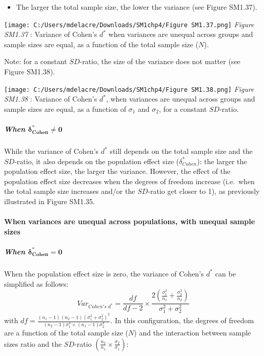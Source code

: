 \documentclass[
  english,
  man,mask,floatsintext]{apa6}
\providecommand{\tightlist}{%
  \setlength{\itemsep}{0pt}\setlength{\parskip}{0pt}}
\let\oldparagraph\paragraph
\renewcommand{\paragraph}[1]{\oldparagraph{#1}\mbox{}}
\let\oldsubparagraph\subparagraph
\renewcommand{\subparagraph}[1]{\oldsubparagraph{#1}\mbox{}}
\begin{document}
\begin{itemize}
\tightlist
\item
  The larger the total sample size, the lower the variance (see Figure SM1.37).
\end{itemize}

\texttt{[image: C:/Users/mdelacre/Downloads/SM1chp4/Figure SM1.37.png]}
\emph{Figure SM1.37} : Variance of Cohen's \(d^*\) when variances are unequal across groups and sample sizes are equal, as a function of the total sample size (\(N\)).

Note: for a constant \(SD\)-ratio, the size of the variance does not matter (see Figure SM1.38).

\texttt{[image: C:/Users/mdelacre/Downloads/SM1chp4/Figure SM1.38.png]}
\emph{Figure SM1.38} : Variance of Cohen's \(d^*\), when variances are unequal across groups and sample sizes are equal, as a function of \(\sigma_1\) and \(\sigma_2\), for a constant \(SD\)-ratio.

\hypertarget{when-bmdelta_cohen-neq-0-1}{%
\subparagraph{\texorpdfstring{When \(\bm{\delta^*_{Cohen} \neq 0}\)}{When \textbackslash bm\{\textbackslash delta\^{}*\_\{Cohen\} \textbackslash neq 0\}}}\label{when-bmdelta_cohen-neq-0-1}}

While the variance of Cohen's \(d^*\) still depends on the total sample size and the \(SD\)-ratio, it also depends on the population effect size (\(\delta^*_{Cohen}\)): the larger the population effect size, the larger the variance. However, the effect of the population effect size decreases when the degrees of freedom increase (i.e.~when the total sample size increases and/or the \(SD\)-ratio get closer to 1), as previously illustrated in Figure SM1.35.

\hypertarget{when-variances-are-unequal-across-populations-with-unequal-sample-sizes-3}{%
\paragraph{When variances are unequal across populations, with unequal sample sizes}\label{when-variances-are-unequal-across-populations-with-unequal-sample-sizes-3}}

\hypertarget{when-bmdelta_cohen-0-2}{%
\subparagraph{\texorpdfstring{When \(\bm{\delta^*_{Cohen} = 0}\)}{When \textbackslash bm\{\textbackslash delta\^{}*\_\{Cohen\} = 0\}}}\label{when-bmdelta_cohen-0-2}}

When the population effect size is zero, the variance of Cohen's \(d^*\) can be simplified as follows:
\[Var_{Cohen's \; d^*} = \frac{df}{df-2} \times \frac{2\left( \frac{\sigma^2_1}{n_1} + \frac{\sigma^2_2}{n_2} \right)}{\sigma^2_1+\sigma^2_2}\]
with \(df =\frac{(n_1-1)(n_2-1)(\sigma^2_1+\sigma^2_2)^2}{(n_2-1)\sigma_1^4+(n_1-1)\sigma_2^4}\). In this configuration, the degrees of freedom are a function of the total sample size (\(N\)) and the interaction between sample sizes ratio and the \(SD\)-ratio \(\left(\frac{n_2}{n_1}\times\frac{\sigma_2}{\sigma_1} \right)\):
\end{document}
